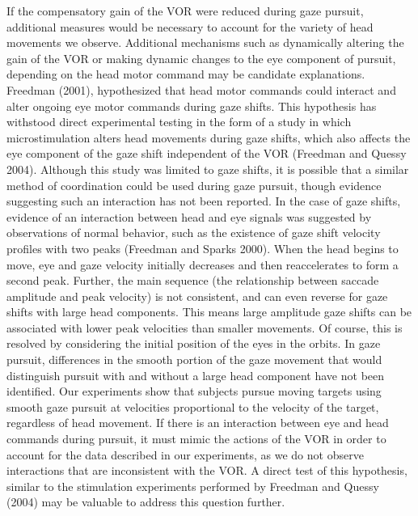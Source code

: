 \documentclass[12pt]{article}
\begin{document}
If the compensatory gain of the VOR were reduced during gaze pursuit, additional measures would be necessary to account for the variety of head movements we observe. Additional mechanisms such as dynamically altering the gain of the VOR or making dynamic changes to the eye component of pursuit, depending on the head motor command may be candidate explanations. Freedman (2001), hypothesized that head motor commands could interact and alter ongoing eye motor commands during gaze shifts. This hypothesis has withstood direct experimental testing in the form of a study in which microstimulation alters head movements during gaze shifts, which also affects the eye component of the gaze shift independent of the VOR (Freedman and Quessy 2004). Although this study was limited to gaze shifts, it is possible that a similar method of coordination could be used during gaze pursuit, though evidence suggesting such an interaction has not been reported. In the case of gaze shifts, evidence of an interaction between head and eye signals was suggested by observations of normal behavior, such as the existence of gaze shift velocity profiles with two peaks (Freedman and Sparks 2000).  When the head begins to move, eye and gaze velocity initially decreases and then reaccelerates to form a second peak. Further, the main sequence (the relationship between saccade amplitude and peak velocity) is not consistent, and can even reverse for gaze shifts with large head components. This means large amplitude gaze shifts can be associated with lower peak velocities than smaller movements. Of course, this is resolved by considering the initial position of the eyes in the orbits. In gaze pursuit, differences in the smooth portion of the gaze movement that would distinguish pursuit with and without a large head component have not been identified. Our experiments show that subjects pursue moving targets using smooth gaze pursuit at velocities proportional to the velocity of the target, regardless of head movement. If there is an interaction between eye and head commands during pursuit, it must mimic the actions of the VOR in order to account for the data described in our experiments, as we do not observe interactions that are inconsistent with the VOR. A direct test of this hypothesis, similar to the stimulation experiments performed by Freedman and Quessy (2004) may be valuable to address this question further.
\end{document}
